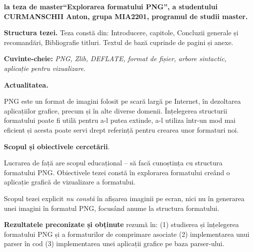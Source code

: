 \documentclass[a4paper,12pt]{report}
\newcommand{\authorName}{CURMANSCHII Anton}
\newcommand{\thesisTitle}{Explorarea formatului PNG}
\newcommand{\uniGroupName}{MIA2201}
\newcommand{\thesisType}{master}
\newcommand{\programulDeStudii}{master}
\begin{document}


\clearpage
\tableofcontents

\clearpage
{}
\begin{acronym}[RAII]
\end{acronym}


\clearpage
{}

\textbf{la teza de \thesisType ``\thesisTitle'', a studentului \authorName{}, grupa \uniGroupName{}, programul de studii \programulDeStudii.}

\textbf{Structura tezei.}
Teza constă din: Introducere,  capitole, Concluzii generale și recomandări, Bibliografie \bibliographyEntryCount{} titluri.
Textul de bază cuprinde \usefulPageCount{} de pagini și \anexeCount{} anexe.

\textbf{Cuvinte-cheie:}
\textit{\acs{PNG}, Zlib, DEFLATE, format de fișier, arbore sintactic, aplicație pentru vizualizare.}

\textbf{Actualitatea.}

\acs{PNG} este un format de imagini folosit pe scară largă pe Internet,
în dezoltarea aplicațiilor grafice, precum și în alte diverse domenii.
Înțelegerea structurii formatului poate fi utilă pentru a-l putea extinde, 
a-l utiliza într-un mod mai eficient și acesta poate servi drept referință pentru 
crearea unor formaturi noi.

\textbf{Scopul și obiectivele cercetării}.

Lucrarea de față are scopul educațional -- să facă cunoștința cu structura formatului \acs{PNG}.
Obiectivele tezei constă în explorarea formatului creând o aplicație grafică de vizualizare a formatului.

Scopul tezei explicit \textit{nu constă} în afișarea imaginii pe ecran,
nici nu în generarea unei imagini în formatul PNG,
focusând anume la structura formatului.

\textbf{Rezultatele preconizate și obținute} rezumă în: 
(1) studierea și înțelegerea formatului \acs{PNG} și a formaturilor de comprimare asociate 
(2) implementarea unui parser în cod
(3) implementarea unei aplicații grafice pe baza parser-ului.
\end{document}
